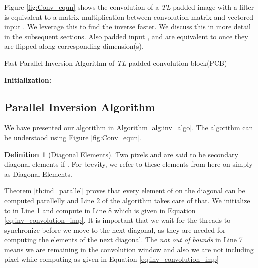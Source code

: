 \documentclass[a4paper,twoside]{article}
\theoremstyle{definition}
\newtheorem{definition}{Definition}
\begin{document}
Figure \ref{fig:Conv_equn} shows the convolution of a \emph{TL} padded  image with a  filter is equivalent to a matrix multiplication between convolution matrix  and vectored input .  We leverage this to find the inverse faster. We discuss this in more detail in the subsequent sections. Also padded input ,  and  are equivalent to  once they are flipped along corresponding dimension(s).  



\begin{algorithm}[!t] 
    \caption{Fast Parallel Inversion Algorithm of \emph{TL} padded convolution block(PCB)}
    \label{alg:inv_algo}
    \textbf{Initialization:}  \;
\end{algorithm}

\subsection{Parallel Inversion Algorithm}\label{subsec:PIA}
We have presented our algorithm in Algorithm \ref{alg:inv_algo}. The algorithm can be understood using Figure \ref{fig:Conv_equn}. 


\begin{definition}[Diagonal Elements]
Two pixels  and  are said to be secondary diagonal elements if  . For brevity, we refer to these elements from here on simply as Diagonal Elements.
\end{definition}


Theorem \ref{th:ind_parallel} proves that every element of on the diagonal can be computed parallelly and Line 2 of the algorithm takes care of that. We initialize  to  in Line 1 and compute  in Line 8 which is given in Equation \ref{eq:inv_convolution_imp}. 
It is important that we wait for the threads to synchronize before we move to the next diagonal, as they are needed for computing the elements of the next diagonal. The \emph{not out of bounds} in Line 7 means we are remaining in the  convolution window and also we are not including pixel  while computing  as given in Equation \ref{eq:inv_convolution_imp}
\end{document}

